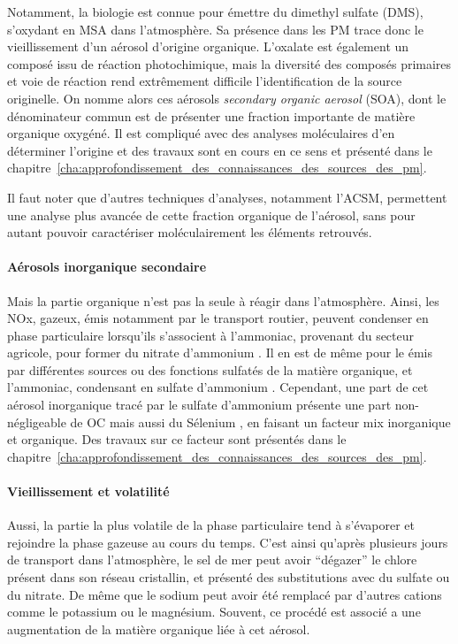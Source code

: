 Notamment, la biologie est connue pour émettre du dimethyl sulfate (DMS), s'oxydant en
MSA dans l'atmosphère. Sa présence dans les PM trace donc le vieillissement d'un aérosol
d'origine organique.  L'oxalate est également un composé issu de réaction photochimique,
mais la diversité des composés primaires et voie de réaction rend extrêmement difficile
l'identification de la source originelle.
On nomme alors ces aérosols \textit{secondary organic aerosol} (SOA), dont le
dénominateur commun est de présenter une fraction importante de matière organique
oxygéné. Il est compliqué avec des analyses moléculaires d'en déterminer l'origine et des
travaux sont en cours en ce sens et présenté dans le
chapitre~\ref{cha:approfondissement_des_connaissances_des_sources_des_pm}.

Il faut noter que d'autres techniques d'analyses, notamment l'ACSM, permettent une
analyse plus avancée de cette fraction organique de l'aérosol, sans pour autant pouvoir
caractériser moléculairement les éléments retrouvés.

\paragraph{Aérosols inorganique secondaire}%
\label{par:aérosols_inorganique_secondaire}

Mais la partie organique n'est pas la seule à réagir dans l'atmosphère. Ainsi, les NOx,
gazeux, émis notamment par le transport routier, peuvent condenser en phase particulaire
lorsqu'ils s'associent à l'ammoniac, provenant du secteur agricole, pour former du
nitrate d'ammonium . Il en est de même pour le  émis par différentes
sources ou des fonctions sulfatés de la matière organique, et l'ammoniac, condensant en
sulfate d'ammonium . Cependant, une part de cet aérosol inorganique tracé
par le sulfate d'ammonium présente une part non-négligeable de OC mais aussi du Sélenium
, en faisant un facteur mix inorganique et organique. Des travaux sur ce facteur
sont présentés dans le
chapitre~\ref{cha:approfondissement_des_connaissances_des_sources_des_pm}.

\paragraph{Vieillissement et volatilité}%
\label{par:vieillissement_et_volatilité}

Aussi, la partie la plus volatile de la phase particulaire tend à s'évaporer et rejoindre
la phase gazeuse au cours du temps. C'est ainsi qu'après plusieurs jours de transport
dans l'atmosphère, le sel de mer peut avoir ``dégazer'' le chlore présent dans son réseau
cristallin, et présenté des substitutions avec du sulfate ou du nitrate. De même que le
sodium peut avoir été remplacé par d'autres cations comme le potassium ou le magnésium.
Souvent, ce procédé est associé a une augmentation de la matière organique liée à cet
aérosol.


